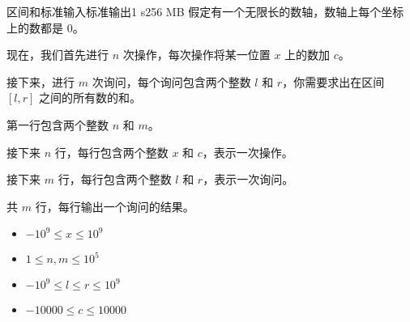 \begin{problem}{区间和}{标准输入}{标准输出}{1 s}{256 MB}
假定有一个无限长的数轴，数轴上每个坐标上的数都是 $0$。

现在，我们首先进行 $n$ 次操作，每次操作将某一位置 $x$ 上的数加 $c$。

接下来，进行 $m$ 次询问，每个询问包含两个整数 $l$ 和 $r$，你需要求出在区间 $[l,r]$ 之间的所有数的和。

\InputFile
第一行包含两个整数 $n$ 和 $m$。

接下来 $n$ 行，每行包含两个整数 $x$ 和 $c$，表示一次操作。

接下来 $m$ 行，每行包含两个整数 $l$ 和 $r$，表示一次询问。

\OutputFile
共 $m$ 行，每行输出一个询问的结果。

\Example

\begin{example}
\end{example}

\Constraints

\begin{itemize}
    \item $-10^9 \leq x \leq 10^9$
    \item $1 \leq n, m \leq 10^5$
    \item $-10^9 \leq l \leq r \leq 10^9$
    \item $-10000 \leq c \leq 10000$
\end{itemize}

\end{problem}
